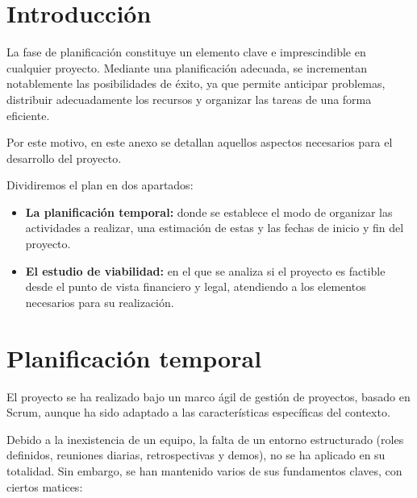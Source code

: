 
\section{Introducción}

La fase de planificación constituye un elemento clave e imprescindible en cualquier proyecto.
Mediante una planificación adecuada, se incrementan notablemente las posibilidades de éxito, ya
que permite anticipar problemas, distribuir adecuadamente los recursos y organizar las tareas de una
forma eficiente.

Por este motivo, en este anexo se detallan aquellos aspectos necesarios para el desarrollo
del proyecto.

Dividiremos el plan en dos apartados:
\begin{itemize}
    \item \textbf{La planificación temporal:} donde se establece el modo de organizar las actividades a realizar,
    una estimación de estas y las fechas de inicio y fin del proyecto.
    \item \textbf{El estudio de viabilidad:} en el que se analiza si el proyecto es factible desde el punto de vista
financiero y legal, atendiendo a los elementos necesarios para su realización.
\end{itemize}

\section{Planificación temporal}

El proyecto se ha realizado bajo un marco ágil de gestión de proyectos, basado en Scrum, aunque ha sido adaptado a las
características específicas del contexto.


Debido a la inexistencia de un equipo, la falta de un entorno estructurado (roles definidos, reuniones diarias, retrospectivas
y demos), no se ha aplicado en su totalidad.
Sin embargo, se han mantenido varios de sus fundamentos claves, con ciertos matices:

